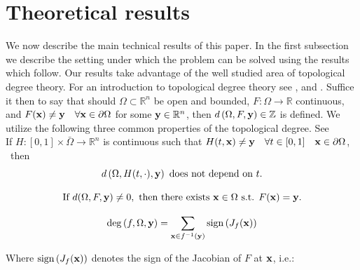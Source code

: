 \documentclass[11pt]{article}
\theoremstyle{plain}
\theoremstyle{definition}
\theoremstyle{remark}
\begin{document}
\section{Theoretical results}
We now describe the main technical results of this paper. 
In the first subsection we describe the setting under which the problem can be solved using the results which follow. Our results take advantage of the well studied area of topological degree theory. 
For an introduction to topological degree theory see \cite{OrChCh2006}, \cite{fonseca1995degree} and \cite{MoVrYa2002}. 
Suffice it then to say that should $\Omega\subset\mathbb{R}^{n}$ be open and bounded, $F:\Omega\rightarrow \mathbb{R}$ continuous, and $F(\bold x)\neq \bold y \quad \forall \bold x\in\partial\Omega$ for some $\bold y\in\mathbb{R}^n$, then $d\left(\Omega,F,\bold y\right)\in\mathbb{Z}$ is defined. 
We utilize the following three common properties of the topological degree. See \cite{OrChCh2006} \\

If $H : [0,1]\times\bar{\Omega}\rightarrow\mathbb{R}^n$ is continuous such that $H(t,\bold x)\neq \bold y \quad \forall t\in[0,1]\quad \bold x\in\partial\Omega$,   \ then 
\begin{equation}\label{eq:Deg1} 
d\left(\Omega,H(t,\cdot),\bold y\right)\text{ does not depend on }t.
\end{equation}

\begin{equation}\label{eq:Deg2}
\text{If }d(\Omega,F,\bold y)\neq 0,\text{ then there exists }\bold x\in\Omega\text{ s.t. }F(\bold x)=\bold y. 
\end{equation}

\begin{equation}\label{eq:Deg3}
\operatorname{deg}\left(f,\Omega,\bold y\right)=\sum\limits_{\bold x\in f^{-1}(\bold y)}\operatorname{sign}\left(J_f(\bold x)\right)
\end{equation}

Where $\operatorname{sign}\left(J_f(\bold x)\right)$ denotes the sign of the Jacobian of $F$ at $\bold x$, i.e.:
\end{document}
